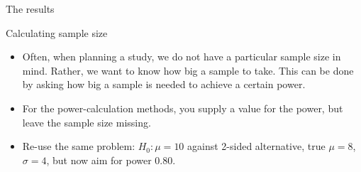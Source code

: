 \documentclass[unknownkeysallowed]{beamer}\usepackage[]{graphicx}\usepackage[]{color}
\begin{document}
\begin{frame}[fragile]{The results}
  
  
\end{frame}


\begin{frame}[fragile]{Calculating sample size}
  
  \begin{itemize}
  \item Often, when planning a study, we do not have a particular
    sample size in mind. Rather, we want to know how big a sample to
    take. This can be done by asking how big a sample is needed to
    achieve a certain power.
  \item For the power-calculation methods, you supply a value for the
    power, but leave the sample size missing.
  \item Re-use the same problem: $H_0: \mu=10$ against 2-sided
    alternative, true $\mu=8$, $\sigma=4$, but now aim for power 0.80.
  \end{itemize}
  
\end{frame}
\end{document}
